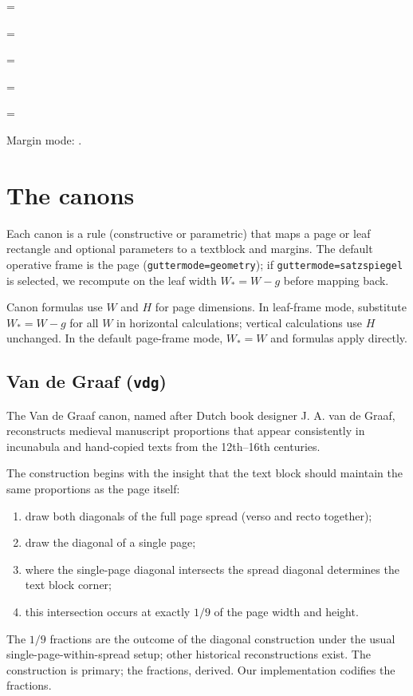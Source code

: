 \documentclass[11pt, twoside, openany]{book}
\newcommand{\showlen}[2]{\noindent\texttt{#1} = \the#2\par}
\begin{document}
\showlen{\string\textwidth}{\textwidth}
\showlen{\string\marginparwidth}{\marginparwidth}
\showlen{\string\marginparsep}{\marginparsep}
\showlen{\string\marginandtext}{\marginandtext}
\showlen{\string\fullwidthoverhang}{\fullwidthoverhang}

Margin mode: \texttt{\pagecanonmargins}.


\chapter{The canons}\label{chapter:canons}

Each canon is a rule (constructive or parametric) that maps a page or leaf rectangle and optional parameters to a textblock and margins. The default operative frame is the page (\texttt{guttermode=geometry}); if \texttt{guttermode=satzspiegel} is selected, we recompute on the leaf width $W_\ast=W-g$ before mapping back.

Canon formulas use $W$ and $H$ for page dimensions. In leaf-frame mode, substitute $W_\ast = W - g$ for all $W$ in horizontal calculations; vertical calculations use $H$ unchanged. In the default page-frame mode, $W_\ast = W$ and formulas apply directly.

\section{Van de Graaf (\texttt{vdg})}\label{sec:vdg}

The Van de Graaf canon, named after Dutch book designer J. A. van de Graaf, reconstructs medieval manuscript proportions that appear consistently in incunabula and hand-copied texts from the 12th--16th centuries.

The construction begins with the insight that the text block should maintain the same proportions as the page itself:
\begin{enumerate}
	\item draw both diagonals of the full page spread (verso and recto together);
	\item draw the diagonal of a single page;
	\item where the single-page diagonal intersects the spread diagonal determines the text block corner;
	\item this intersection occurs at exactly $1/9$ of the page width and height.
\end{enumerate}

The $1/9$ fractions are the outcome of the diagonal construction under the usual single-page-within-spread setup; other historical reconstructions exist. The construction is primary; the fractions, derived. Our implementation codifies the fractions.
\end{document}
